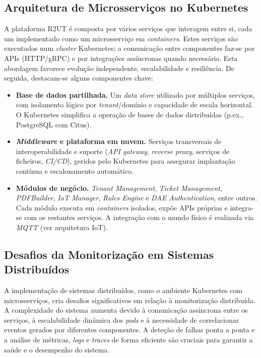\subsection{Arquitetura de Microsserviços no Kubernetes}

A plataforma R2UT é composta por vários serviços que interagem entre si, cada um implementado como um microsserviço em \textit{containers}. Estes serviços são executados num \textit{cluster} Kubernetes; a comunicação entre componentes faz-se por APIs (HTTP/gRPC) e por integrações assíncronas quando necessário. Esta abordagem favorece evolução independente, escalabilidade e resiliência. De seguida, destacam-se alguns componentes chave:

\begin{itemize}
  \item \textbf{Base de dados partilhada.} Um \textit{data store} utilizado por múltiplos serviços, com isolamento lógico por \textit{tenant}/domínio e capacidade de escala horizontal. O Kubernetes simplifica a operação de bases de dados distribuídas (p.ex., PostgreSQL com Citus).

  \item \textbf{\textit{Middleware} e plataforma em nuvem.} Serviços transversais de interoperabilidade e suporte (\textit{API gateway}, \textit{reverse proxy}, serviços de ficheiros, \textit{CI/CD}), geridos pelo Kubernetes para assegurar implantação contínua e escalonamento automático.

  \item \textbf{Módulos de negócio.} \textit{Tenant Management}, \textit{Ticket Management}, \textit{PDFBuilder}, \textit{IoT Manager}, \textit{Rules Engine} e \textit{DAE Authentication}, entre outros. Cada módulo executa em \textit{containers} isolados, expõe APIs próprias e integra-se com os restantes serviços. A integração com o mundo físico é realizada via \textit{MQTT} (ver arquitetura IoT).

\end{itemize}

\subsection{Desafios da Monitorização em Sistemas Distribuídos}

A implementação de sistemas distribuídos, como o ambiente Kubernetes com microsserviços, cria desafios significativos em relação à monitorização distribuída. A complexidade do sistema aumenta devido à comunicação assíncrona entre os serviços, à escalabilidade dinâmica dos \textit{pods} e à necessidade de correlacionar eventos gerados por diferentes componentes. A deteção de falhas ponta a ponta e a análise de métricas, \textit{logs} e \textit{traces} de forma eficiente são cruciais para garantir a saúde e o desempenho do sistema. 


